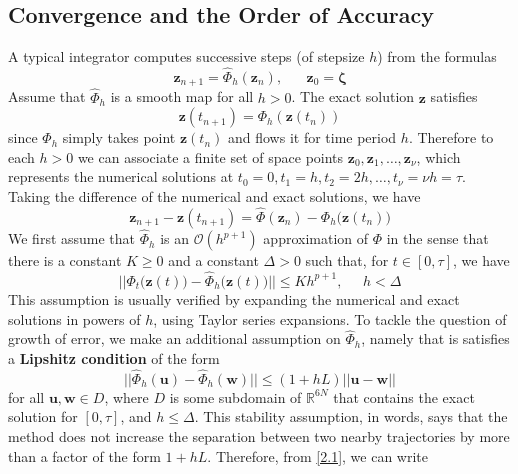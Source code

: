   \subsection{Convergence and the Order of Accuracy}

    A typical integrator computes successive steps (of stepsize $h$) from the formulas 
    \begin{equation}
      \mathbf{z}_{n+1} = \hat{\Phi}_h (\mathbf{z}_n), \;\;\;\;\;\; \mathbf{z}_0 = \boldsymbol{\zeta}
    \end{equation}
    Assume that $\hat{\Phi}_h$ is a smooth map for all $h > 0$. The exact solution $\mathbf{z}$ satisfies
    \begin{equation}
      \mathbf{z} (t_{n+1}) = \Phi_h (\mathbf{z}(t_n))
    \end{equation}
    since $\Phi_h$ simply takes point $\mathbf{z}(t_n)$ and flows it for time period $h$. Therefore to each $h > 0$ we can associate a finite set of space points $\mathbf{z}_0, \mathbf{z}_1, \ldots, \mathbf{z}_\nu$, which represents the numerical solutions at $t_0 = 0, t_1 = h, t_2 = 2h, \ldots, t_\nu = \nu h = \tau$. Taking the difference of the numerical and exact solutions, we have 
    \begin{equation}
      \mathbf{z}_{n+1} - \mathbf{z}(t_{n+1}) = \hat{\Phi}(\mathbf{z}_n) - \Phi_h \big(\mathbf{z}(t_n) \big) \label{2.1} \tag{2.1}
    \end{equation}
    We first assume that $\hat{\Phi}_h$ is an $\mathcal{O}(h^{p+1})$ approximation of $\Phi$ in the sense that there is a constant $K \geq 0$ and a constant $\Delta > 0$ such that, for $t \in [0, \tau]$, we have 
    \begin{equation}
      || \Phi_t\big(\mathbf{z}(t)\big) - \hat{\Phi}_h \big(\mathbf{z}(t)\big) || \leq K h^{p+1}, \;\;\;\;\; h < \Delta
    \end{equation}
    This assumption is usually verified by expanding the numerical and exact solutions in powers of $h$, using Taylor series expansions. To tackle the question of growth of error, we make an additional assumption on $\hat{\Phi}_h$, namely that is satisfies a \textbf{Lipshitz condition} of the form 
    \begin{equation}
      ||\hat{\Phi}_h (\mathbf{u}) - \hat{\Phi}_h (\mathbf{w})|| \leq (1 + h L) || \mathbf{u} - \mathbf{w}||
    \end{equation}
    for all $\mathbf{u}, \mathbf{w} \in D$, where $D$ is some subdomain of $\mathbb{R}^{6N}$ that contains the exact solution for $[0, \tau]$, and $h \leq \Delta$. This stability assumption, in words, says that the method does not increase the separation between two nearby trajectories by more than a factor of the form $1 + hL$. Therefore, from \eqref{2.1}, we can write 
